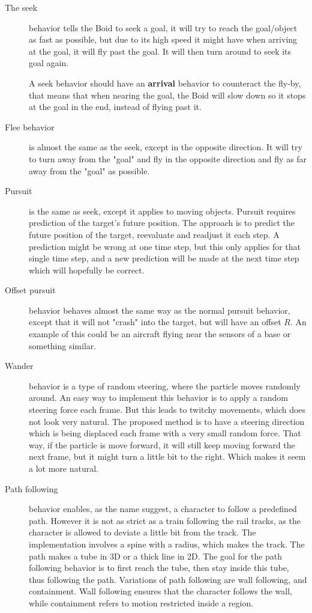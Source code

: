 \begin{description}
\label{boids:behaviors}
\item[The seek]behavior tells the Boid to seek a goal, it will try to reach the goal/object as fast as possible, but due to its high speed it might have when arriving at the goal, it will fly past the goal. It will then turn around to seek its goal again.

A seek behavior should have an \textbf{arrival} behavior to counteract the fly-by, that means that when nearing the goal, the Boid will slow down so it stops at the goal in the end, instead of flying past it.

\item [Flee behavior] is almost the same as the seek, except in the opposite direction. It will try to turn away from the "goal" and fly in the opposite direction and fly as far away from the "goal" as possible.

\item [Pursuit] is the same as seek, except it applies to moving objects. Pursuit requires prediction of the target's future position. The approach is to predict the future position of the target, reevaluate and readjust it each step. A prediction might be wrong at one time step, but this only applies for that single time step, and a new prediction will be made at the next time step which will hopefully be correct.

\item [Offset pursuit] behavior behaves almost the same way as the normal pursuit behavior, except that it will not "crash" into the target, but will have an offset $R$. An example of this could be an aircraft flying near the sensors of a base or something similar. 

\item [Wander] behavior is a type of random steering, where the particle moves randomly around. An easy way to implement this behavior is to apply a random steering force each frame. But this leads to twitchy movements, which does not look very natural. The proposed method is to have a steering direction which is being displaced each frame with a very small random force.
That way, if the particle is move forward, it will still keep moving forward the next frame, but it might turn a little bit to the right. Which makes it seem a lot more natural.

\item [Path following] behavior enables, as the name suggest, a character to follow a predefined path. However it is not as strict as a train following the rail tracks, as the character is allowed to deviate a little bit from the track. The implementation involves a spine with a radius, which makes the track. The path makes a tube in 3D or a thick line in 2D. The goal for the path following behavior is to first reach the tube, then stay inside this tube, thus following the path. Variations of path following are wall following, and containment. Wall following ensures that the character follows the wall, while containment refers to motion restricted inside a region.


\end{description}
